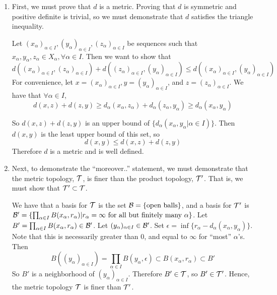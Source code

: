 \begin{myproof}
	\begin{enumerate}
		\item First, we must prove that $d$ is a metric. Proving that $d$ is symmetric and positive definite is trivial, so we must demonstrate that $d$ satisfies the triangle inequality.
		
		Let $(x_\alpha)_{\alpha\in I}, (y_\alpha)_{\alpha\in I}, (z_\alpha)_{\alpha\in I}$ be sequences such that $x_\alpha, y_\alpha, z_\alpha\in X_\alpha, \forall\alpha\in I$. Then we want to show that
		$$d((x_\alpha)_{\alpha\in I}, (z_\alpha)_{\alpha\in I})  + d((z_\alpha)_{\alpha\in I}, (y_\alpha)_{\alpha\in I}) \leq d((x_\alpha)_{\alpha\in I}, (y_\alpha)_{\alpha\in I})$$
		For convenience, let $x = (x_\alpha)_{\alpha\in I}, y = (y_\alpha)_{\alpha\in I}$, and $z = (z_\alpha)_{\alpha\in I}$. We have that $\forall \alpha\in I$, 
		$$d(x,z) + d(z,y)\geq d_\alpha(x_\alpha, z_\alpha) + d_\alpha(z_\alpha, y_\alpha)\geq d_\alpha(x_\alpha, y_\alpha)$$
		
		So $d(x,z) + d(z,y)$ is an upper bound of $\{d_\alpha(x_\alpha,y_\alpha|\alpha\in I)\}$. Then $d(x,y)$ is the least upper bound of this set, so
		$$d(x,y)\leq d(x,z) + d(z,y)$$
		Therefore $d$ is a metric and is well defined.

		\item Next, to demonstrate the ``moreover..'' statement, we must demonstrate that the metric topology, $\mathcal{T}$, is finer than the product topology, $\mathcal{T}'$. That is, we must show that $\mathcal{T}'\subset\mathcal{T}$.
		
		We have that a basis for $\mathcal{T}$ is the set $\mathcal{B} = \{\text{open balls}\}$, and a basis for $\mathcal{T}'$ is $\mathcal{B}' = \{\prod_{\alpha\in I}B(x_\alpha, r_\alpha)| r_\alpha = \infty\text{ for all but finitely many }\alpha\}$. Let $B' = \prod_{\alpha\in I}B(x_\alpha, r_\alpha)\in\mathcal{B}'$. Let $(y_\alpha)_{\alpha\in I}\in \mathcal{B}'$. Set $\epsilon = \inf\{r_\alpha - d_\alpha(x_\alpha, y_\alpha)\}$. Note that this is necessarily greater than 0, and equal to $\infty$ for ``most'' $\alpha$'s. Then 
		$$B((y_\alpha)_{\alpha\in I}) = \prod_{\alpha\in I}B(y_\alpha, \epsilon)\subset B(x_\alpha, r_\alpha)\subset B'$$
		So $B'$ is a neighborhood of $(y_\alpha)_{\alpha\in I}$. Therefore $B'\in \mathcal{T}$, so $B'\in\mathcal{T}'$. Hence, the metric topology $\mathcal{T}$ is finer than $\mathcal{T}'$.


\end{enumerate}
\end{myproof}
